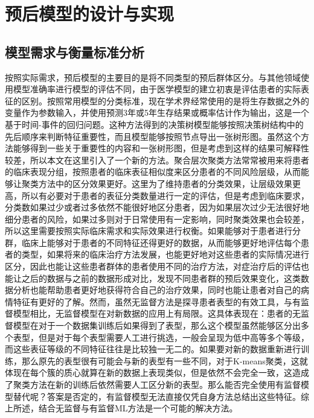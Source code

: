 \chapter{预后模型的设计与实现}
\label{cha:models}

\section{模型需求与衡量标准分析}

按照实际需求，预后模型的主要目的是将不同类型的预后群体区分。与其他领域使用模型准确率进行模型的评估不同，由于医学模型的建立初衷是评估患者的实际表征的区别。按照常用模型的分类标准\cite{cancers12102802}，现在学术界经常使用的是将生存数据之外的变量作为参数输入，并使用预测3年或5年生存结果或概率估计作为输出，这是一个基于时间-事件的回归问题。这种方法得到的决策树模型能够按照决策树结构中的先后顺序来判断特征重要性，而且模型能够按照节点导出一张树形图。虽然这个方法能够得到一些关于重要性的内容和一张树形图，但是考虑到这样的结果可解释性较差，所以本文在这里引入了一个新的方法。聚合层次聚类方法常常被用来将患者的临床表现分组，按照患者的临床表征相似度来区分患者的不同风险层级，从而能够让聚类方法中的区分效果更好。这里为了维持患者的分类效果，让层级效果更高，所以有必要对于患者的表征分类数量进行一定的评估，但是考虑到临床要求，分类数如果过少或者过多依然不能很好地区分患者，因为如果层次过少无法很好地细分患者的风险，如果过多则对于日常使用有一定影响，同时聚类效果也会较差，所以这里需要按照实际临床需求和实际效果进行权衡。如果能够对于患者进行分群，临床上能够对于患者的不同特征还得更好的数据，从而能够更好地评估每个患者的类型，如果将来的临床治疗方法发展，也能更好地对这些患者的实际情况进行区分，因此也能让这些患者群体的患者使用不同的治疗方法，对症治疗后的评估也能让之后的数据与之前的数据形成对比，发现不同患者群的预后效果变化，这类数据分析也能帮助患者更好地获得符合自己的治疗效果，同时也能让患者对自己的病情特征有更好的了解。然而，虽然无监督方法是探寻患者表型的有效工具，与有监督模型相比，无监督模型在对新数据的应用上有局限。这具体表现在：患者的无监督模型在对于一个数据集训练后如果得到了表型，那么这个模型虽然能够区分出多个表型，但是对于每个表型需要人工进行挑选，一般会呈现为低中高等多个等级，而这些表征等级的不同特征往往是比较独一无二的。如果要对新的数据重新进行训练，那么原先的表型很有可能会与新的表型有一些不同，对于K-means聚类，这就体现在每个簇的质心就算在新的数据上表现类似，但是依然不会完全一致，这造成了聚类方法在新的训练后依然需要人工区分新的表型。那么能否完全使用有监督模型替代呢？答案是否定的，有监督模型无法直接仅凭自身方法总结出这些特征。综上所述，结合无监督与有监督ML方法是一个可能的解决方法\cite{life12060776}。

